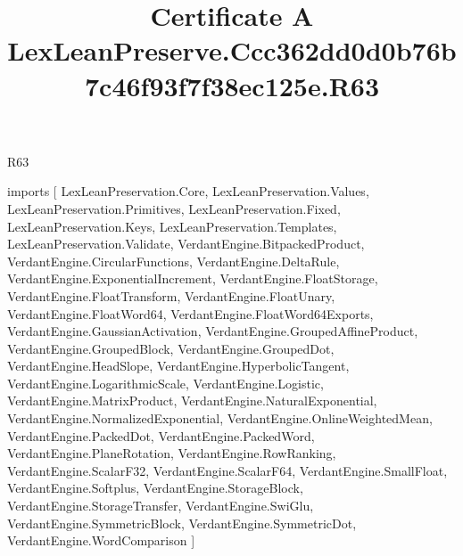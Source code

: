 \begin{lexlean}{R63}
\title{Certificate A LexLeanPreserve.Ccc362dd0d0b76b7c46f93f7f38ec125e.R63}
\begin{coremodule}
imports [
  LexLeanPreservation.Core,
  LexLeanPreservation.Values,
  LexLeanPreservation.Primitives,
  LexLeanPreservation.Fixed,
  LexLeanPreservation.Keys,
  LexLeanPreservation.Templates,
  LexLeanPreservation.Validate,
  VerdantEngine.BitpackedProduct,
  VerdantEngine.CircularFunctions,
  VerdantEngine.DeltaRule,
  VerdantEngine.ExponentialIncrement,
  VerdantEngine.FloatStorage,
  VerdantEngine.FloatTransform,
  VerdantEngine.FloatUnary,
  VerdantEngine.FloatWord64,
  VerdantEngine.FloatWord64Exports,
  VerdantEngine.GaussianActivation,
  VerdantEngine.GroupedAffineProduct,
  VerdantEngine.GroupedBlock,
  VerdantEngine.GroupedDot,
  VerdantEngine.HeadSlope,
  VerdantEngine.HyperbolicTangent,
  VerdantEngine.LogarithmicScale,
  VerdantEngine.Logistic,
  VerdantEngine.MatrixProduct,
  VerdantEngine.NaturalExponential,
  VerdantEngine.NormalizedExponential,
  VerdantEngine.OnlineWeightedMean,
  VerdantEngine.PackedDot,
  VerdantEngine.PackedWord,
  VerdantEngine.PlaneRotation,
  VerdantEngine.RowRanking,
  VerdantEngine.ScalarF32,
  VerdantEngine.ScalarF64,
  VerdantEngine.SmallFloat,
  VerdantEngine.Softplus,
  VerdantEngine.StorageBlock,
  VerdantEngine.StorageTransfer,
  VerdantEngine.SwiGlu,
  VerdantEngine.SymmetricBlock,
  VerdantEngine.SymmetricDot,
  VerdantEngine.WordComparison
]


\end{coremodule}
\end{lexlean}
